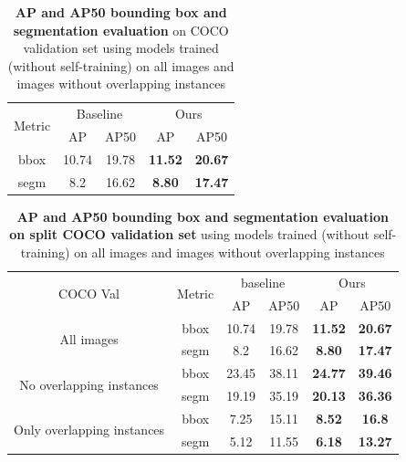 \begin{table}[htbp]
	\centering
	\begin{tabular}{c|cc|cc}
		\toprule
		\multirow{2}{*}{Metric} & \multicolumn{2}{c|}{Baseline} & \multicolumn{2}{c}{Ours} \\ \cmidrule{2-5}
		& AP & AP50 & AP & AP50 \\ \midrule
		bbox & 10.74 & 19.78 & \textbf{11.52} & \textbf{20.67} \\
		\midrule
		segm & 8.2 & 16.62 & \textbf{8.80} & \textbf{17.47} \\
		\bottomrule
	\end{tabular}
	\caption[\textbf{Evaluation of Models Trained with and without Overlapping Instances }]{\textbf{AP and AP50 bounding box and segmentation evaluation} on COCO validation set using models trained (without self-training) on all images and images without overlapping instances}
	\label{tab:overlap_analysis}
\end{table}

\begin{table}[htbp]
	\centering
	\begin{tabular}{c|c|cc|cc}
		\toprule
		\multirow{2}{*}{COCO Val} & \multirow{2}{*}{Metric} & \multicolumn{2}{c|}{baseline} & \multicolumn{2}{c}{Ours} \\ \cmidrule{3-6}
		& & AP & AP50 & AP & AP50 \\ \midrule
		\multirow{2}{*}{All images} & bbox & 10.74 & 19.78 & \textbf{11.52} & \textbf{20.67} \\ 
		& segm & 8.2 & 16.62 & \textbf{8.80} & \textbf{17.47}  \\ \midrule
		\multirow{2}{*}{No overlapping instances} & bbox & 23.45 & 38.11 & \textbf{24.77} & \textbf{39.46} \\
		& segm & 19.19 & 35.19  & \textbf{20.13} & \textbf{36.36} \\
		\midrule
		\multirow{2}{*}{Only overlapping instances} & bbox & 7.25 & 15.11 & \textbf{8.52} & \textbf{16.8} \\ 
		& segm & 5.12 & 11.55 & \textbf{6.18} & \textbf{13.27} \\
		\bottomrule
	\end{tabular}
	\caption[\textbf{Evaluation of Models Trained with and without Overlapping Instances with Evaluation Dataset Split}]{\textbf{AP and AP50 bounding box and segmentation evaluation on split COCO validation set} using models trained (without self-training) on all images and images without overlapping instances}
	\label{tab:combined_overlap_eval}
\end{table}

